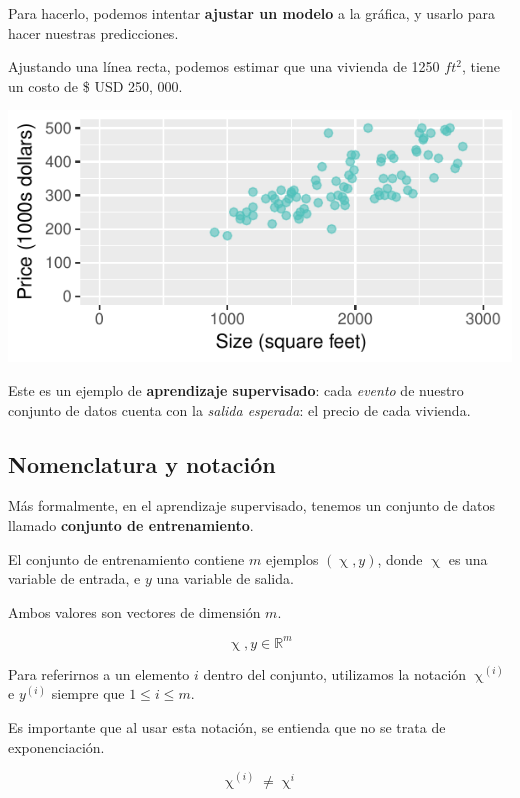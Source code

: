 \documentclass[twoside,twocolumn]{article}
\newcommand{\realset}{\mathbb{R}} %
\begin{document}
        Para hacerlo, podemos intentar \textbf{ajustar un modelo} a la gráfica,
        y usarlo para hacer nuestras predicciones.

        Ajustando una línea recta, podemos estimar que una vivienda de
        1250 $ft^2$, tiene un costo de \$ USD 250, 000.

        \includegraphics[width=\columnwidth, page = 3]{housePrices.pdf}
        
        Este es un ejemplo de \textbf{aprendizaje supervisado}: cada
        \textit{evento} de nuestro conjunto de datos cuenta con la 
        \textit{salida esperada}: el precio de cada vivienda.

        \subsection{Nomenclatura y notación}
          Más formalmente, en el aprendizaje supervisado, tenemos un conjunto
          de datos llamado \textbf{conjunto de entrenamiento}.

          El conjunto de entrenamiento contiene $m$ ejemplos $(\upchi, y)$, donde
          $\upchi$ es una variable de entrada, e $y$ una variable de salida.

          Ambos valores son vectores de dimensión $m$.

          \[
            \upchi
            ,
            y \in \realset^{m}
          \]

          Para referirnos a un elemento $i$ dentro del conjunto, utilizamos la notación
          $\upchi^{(i)}$ e $y^{(i)}$ siempre que $1 \leq i \leq m$.

          Es importante que al usar esta notación, se entienda que no se
          trata de exponenciación.
        
          \[
            \upchi^{(i)} \ne \upchi^i
          \]
\end{document}
